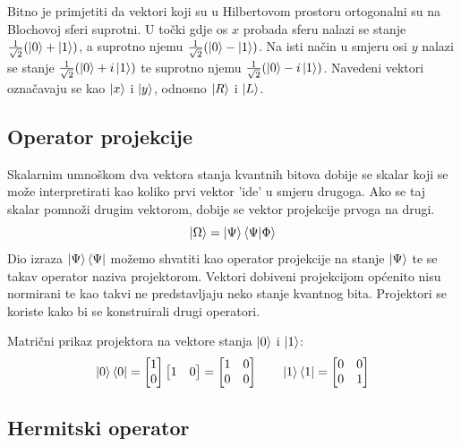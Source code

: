 Bitno je primjetiti da vektori koji su u Hilbertovom prostoru ortogonalni su na Blochovoj sferi suprotni. U točki gdje os $x$ probada sferu nalazi se stanje $\frac{1}{\sqrt{2}}(\ket{0} + \ket{1})$, a suprotno njemu $\frac{1}{\sqrt{2}}(\ket{0} - \ket{1})$. Na isti način u smjeru osi $y$ nalazi se stanje $\frac{1}{\sqrt{2}}(\ket{0} + i\ket{1})$ te suprotno njemu $\frac{1}{\sqrt{2}}(\ket{0} - i\ket{1})$. Navedeni vektori označavaju se kao $\ket{x}$ i $\ket{y}$, odnosno $\ket{R}$ i $\ket{L}$.

\subsection{Operator projekcije}

Skalarnim umnoškom dva vektora stanja kvantnih bitova dobije se skalar koji se može interpretirati kao koliko prvi vektor 'ide' u smjeru drugoga. Ako se taj skalar pomnoži drugim vektorom, dobije se vektor projekcije prvoga na drugi.
\begin{equation}
\ket{\Omega} = \ket{\Psi}\braket{\Psi|\Phi}
\end{equation}
Dio izraza $\ket{\Psi}\bra{\Psi}$ možemo shvatiti kao operator projekcije na stanje $\ket{\Psi}$ te se takav operator naziva projektorom. Vektori dobiveni projekcijom općenito nisu normirani te kao takvi ne predstavljaju neko stanje kvantnog bita. Projektori se koriste kako bi se konstruirali drugi operatori.

Matrični prikaz projektora na vektore stanja $\ket{0}$ i $\ket{1}$:
\begin{equation}
\ket{0}\bra{0} =
\begin{bmatrix}
1 \\ 0
\end{bmatrix}
\begin{bmatrix}
1 & 0
\end{bmatrix}
=
\begin{bmatrix}
1 & 0 \\ 0 & 0
\end{bmatrix}
\qquad
\ket{1}\bra{1} = 
\begin{bmatrix}
0 & 0 \\ 0 & 1
\end{bmatrix}
\end{equation}

\subsection{Hermitski operator}

